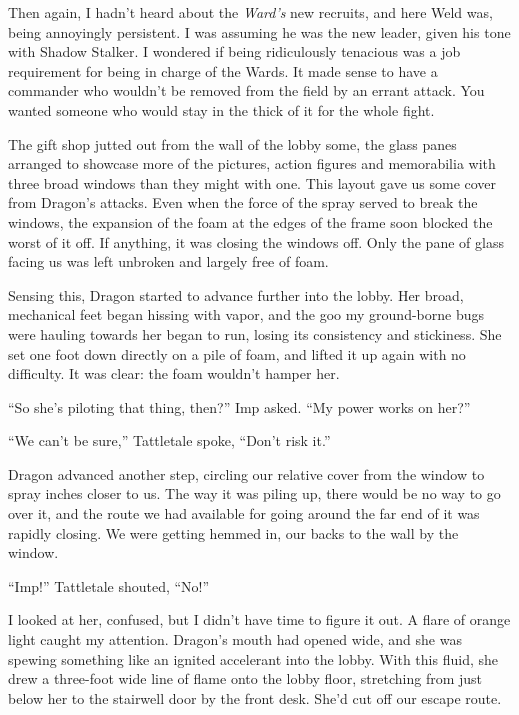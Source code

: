 Then again, I hadn't heard about the \emph{Ward's} new recruits, and here Weld was, being annoyingly persistent.  I was assuming he was the new leader, given his tone with Shadow Stalker.  I wondered if being ridiculously tenacious was a job requirement for being in charge of the Wards.  It made sense to have a commander who wouldn't be removed from the field by an errant attack.  You wanted someone who would stay in the thick of it for the whole fight.



The gift shop jutted out from the wall of the lobby some, the glass panes arranged to showcase more of the pictures, action figures and memorabilia with three broad windows than they might with one.  This layout gave us some cover from Dragon's attacks.  Even when the force of the spray served to break the windows, the expansion of the foam at the edges of the frame soon blocked the worst of it off.  If anything, it was closing the windows off.  Only the pane of glass facing us was left unbroken and largely free of foam.



Sensing this, Dragon started to advance further into the lobby.  Her broad, mechanical feet began hissing with vapor, and the goo my ground-borne bugs were hauling towards her began to run, losing its consistency and stickiness.  She set one foot down directly on a pile of foam, and lifted it up again with no difficulty.  It was clear: the foam wouldn't hamper her.



``So she's piloting that thing, then?'' Imp asked.  ``My power works on her?''



``We can't be sure,'' Tattletale spoke, ``Don't risk it.''



Dragon advanced another step, circling our relative cover from the window to spray inches closer to us.  The way it was piling up, there would be no way to go over it, and the route we had available for going around the far end of it was rapidly closing.  We were getting hemmed in, our backs to the wall by the window.



``Imp!'' Tattletale shouted, ``No!''



I looked at her, confused, but I didn't have time to figure it out.  A flare of orange light caught my attention.  Dragon's mouth had opened wide, and she was spewing something like an ignited accelerant into the lobby.  With this fluid, she drew a three-foot wide line of flame onto the lobby floor, stretching from just below her to the stairwell door by the front desk.  She'd cut off our escape route.



